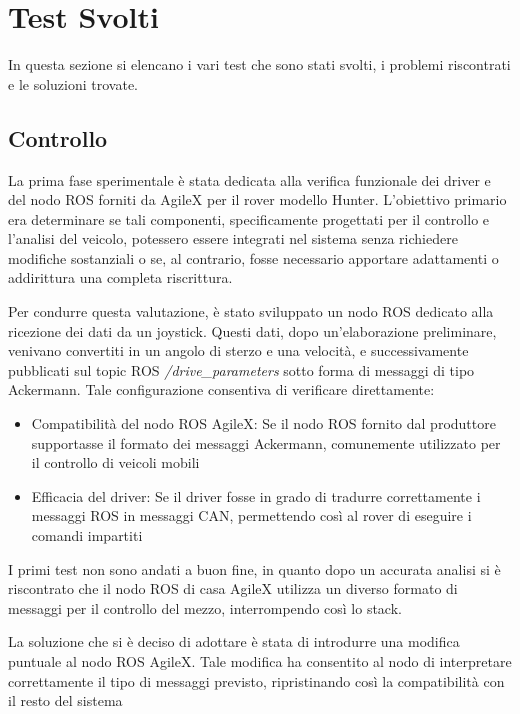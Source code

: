 \section{Test Svolti}
In questa sezione si elencano i vari test che sono stati svolti, i problemi riscontrati e le soluzioni trovate.

\subsection{Controllo}
La prima fase sperimentale è stata dedicata alla verifica funzionale dei driver e del nodo ROS forniti da AgileX per il rover modello Hunter. L'obiettivo primario era determinare se tali componenti, specificamente progettati per il controllo e l'analisi del veicolo, potessero essere integrati nel sistema senza richiedere modifiche sostanziali o se, al contrario, fosse necessario apportare adattamenti o addirittura una completa riscrittura.

\noindent Per condurre questa valutazione, è stato sviluppato un nodo ROS dedicato alla ricezione dei dati da un joystick. Questi dati, dopo un'elaborazione preliminare, venivano convertiti in un angolo di sterzo e una velocità, e successivamente pubblicati sul topic ROS \textit{/drive\_parameters} sotto forma di messaggi di tipo Ackermann. Tale configurazione consentiva di verificare direttamente:

\begin{itemize}
  \item Compatibilità del nodo ROS AgileX: Se il nodo ROS fornito dal produttore supportasse il formato dei messaggi Ackermann, comunemente utilizzato per il controllo di veicoli mobili
  \item Efficacia del driver: Se il driver fosse in grado di tradurre correttamente i messaggi ROS in messaggi CAN, permettendo così al rover di eseguire i comandi impartiti
\end{itemize}

\noindent I primi test non sono andati a buon fine, in quanto dopo un accurata analisi si è riscontrato che il nodo ROS di casa AgileX utilizza un diverso formato di messaggi per il controllo del mezzo, interrompendo così lo stack.

\noindent La soluzione che si è deciso di adottare è stata di introdurre una modifica puntuale al nodo ROS AgileX. Tale modifica ha consentito al nodo di interpretare correttamente il tipo di messaggi previsto, ripristinando così la compatibilità con il resto del sistema

